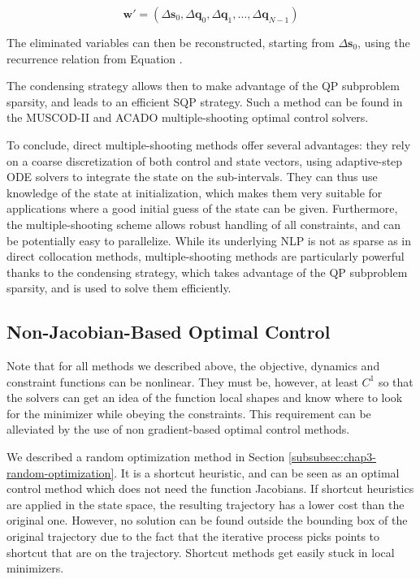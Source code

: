 \begin{equation}
  \mathbf{w}' =
  (\Delta\mathbf{s}_0,\Delta\mathbf{q}_0,\Delta\mathbf{q}_1,
  \ldots,\Delta\mathbf{q}_{N-1})
\end{equation}

The eliminated variables can then be reconstructed, starting from
$\Delta\mathbf{s}_0$, using the recurrence relation from Equation
.

The condensing strategy allows then to make advantage of the QP
subproblem sparsity, and leads to an efficient SQP strategy. Such a
method can be found in the \textsc{MUSCOD-II}
\cite{leineweber2003efficient1,leineweber2003efficient2} and
\textsc{ACADO} \cite{houska2010acado} multiple-shooting optimal
control solvers.

To conclude, direct multiple-shooting methods offer several
advantages: they rely on a coarse discretization of both control and
state vectors, using adaptive-step ODE solvers to integrate the state
on the sub-intervals. They can thus use knowledge of the state at
initialization, which makes them very suitable for applications where
a good initial guess of the state can be given. Furthermore, the
multiple-shooting scheme allows robust handling of all constraints,
and can be potentially easy to parallelize. While its underlying NLP
is not as sparse as in direct collocation methods, multiple-shooting
methods are particularly powerful thanks to the condensing strategy,
which takes advantage of the QP subproblem sparsity, and is used to
solve them efficiently.

\subsection{Non-Jacobian-Based Optimal Control}
\label{subsec:chap3-non-jacobian}

Note that for all methods we described above, the objective, dynamics
and constraint functions can be nonlinear. They must be, however, at
least $C^1$ so that the solvers can get an idea of the function local
shapes and know where to look for the minimizer while obeying the
constraints. This requirement can be alleviated by the use of non
gradient-based optimal control methods.

We described a random optimization method in Section
\ref{subsubsec:chap3-random-optimization}. It is a shortcut heuristic,
and can be seen as an optimal control method which does not need the
function Jacobians. If shortcut heuristics are applied in the state
space, the resulting trajectory has a lower cost than the original
one. However, no solution can be found outside the bounding box of the
original trajectory due to the fact that the iterative process picks
points to shortcut that are on the trajectory. Shortcut methods get
easily stuck in local minimizers.


